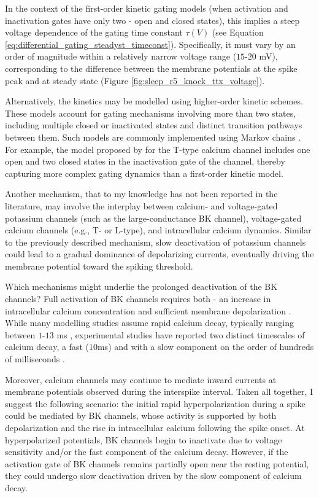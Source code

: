 \documentclass[../main.tex]{subfiles}
\begin{document}
In the context of the first-order kinetic gating models (when activation and inactivation gates have only two - open and closed states), this implies a steep voltage dependence of the gating time constant $\tau(V)$ (see Equation \ref{eq:differential_gating_steadyst_timeconst}). 
Specifically, it must vary by an order of magnitude within a relatively narrow voltage range ($15$-$20$ mV), corresponding to the difference between the membrane potentials at the spike peak and at steady state (Figure \ref{fig:sleep_r5_knock_ttx_voltage}).

Alternatively, the kinetics may be modelled using higher-order kinetic schemes. These models account for gating mechanisms involving more than two states, including multiple closed or inactivated states and distinct transition pathways between them. Such models are commonly implemented using Markov chains \parencite{mangoldIdentificationStructuresIon2021}. For example, the model proposed by \textcite{wangModelTtypeCalcium1991} for the T-type calcium channel includes one open and two closed states in the inactivation gate of the channel, thereby capturing more complex gating dynamics than a first-order kinetic model.

Another mechanism, that to my knowledge has not been reported in the literature, may involve the interplay between calcium- and voltage-gated potassium channels (such as the large-conductance BK channel), voltage-gated calcium channels (e.g., T- or L-type), and intracellular calcium dynamics.
Similar to the previously described mechanism, slow deactivation of potassium channels could lead to a gradual dominance of depolarizing currents, eventually driving the membrane potential toward the spiking threshold.

Which mechanisms might underlie the prolonged deactivation of the BK channels?
Full activation of BK channels requires both - an increase in intracellular calcium concentration and sufficient membrane depolarization \parencite{liuMultipleConductancesCooperatively2008}.
While many modelling studies assume rapid calcium decay, typically ranging between $1$-$13$ ms \parencite{huguenardSimulationCurrentsInvolved1992,golombContributionPersistentNa2006,parkMathematicalModelSubthalamic2021}, experimental studies have reported two distinct timescales of calcium decay, a fast ($10$ms) and with a slow component on the order of hundreds of milliseconds \parencite{theisBenchmarkingSpikeRate2016,koesterCalciumDynamicsAssociated2000}.

Moreover, calcium channels may continue to mediate inward currents at membrane potentials observed during the interspike interval. Taken all together, I suggest the following scenario: the initial rapid hyperpolarization during a spike could be mediated by BK channels, whose activity is supported by both depolarization and the rise in intracellular calcium following the spike onset. At hyperpolarized potentials, BK channels begin to inactivate due to voltage sensitivity and/or the fast component of the calcium decay. However, if the activation gate of BK channels remains partially open near the resting potential, they could undergo slow deactivation driven by the slow component of calcium decay.
\end{document}
